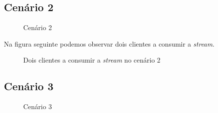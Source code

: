 \documentclass[a4paper, 11pt]{article}
\begin{document}
\subsection{Cenário 2}

\begin{figure}[H]
    \centering
    \caption {Cenário 2}
\end{figure}

Na figura seguinte podemos observar dois clientes a consumir a \textit{stream}.

\begin{figure}[H]
    \centering
    \caption {Dois clientes a consumir a \textit{stream} no cenário 2}
\end{figure}


\subsection{Cenário 3}

\begin{figure}[H]
    \centering
    \caption {Cenário 3}
\end{figure}
\end{document}
